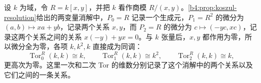 设 \(k\) 为域，令 \(R=k[x,y]\)，并把 \(k\) 看作商模 \(R/(x,y)\)。\cref{b4:prop:koszul-resolution}给出的两变量消解中，\(P_0=R\) 记录一个生成元，\(P_1=R^2\) 的微分为 \((a,b)\mapsto xa+yb\)，记录两个关系 \(x,y\)，而 \(P_2=R\) 的微分为 \(c\mapsto(-yc,xc)\)，记录这两个关系之间的关系 \(x(-y)+yx=0\)。与 \(k\) 张量后，\(x,y\) 都作用为零，所以微分全为零，各项 \(k,k^2,k\) 直接成为同调：
\[
	\operatorname{Tor}_0^R(k,k)\cong k,\qquad \operatorname{Tor}_1^R(k,k)\cong k^2,\qquad \operatorname{Tor}_2^R(k,k)\cong k,
\]
更高次为零。这里一次和二次 Tor 的维数分别记录了这个消解中的两个关系以及它们之间的一条关系。
